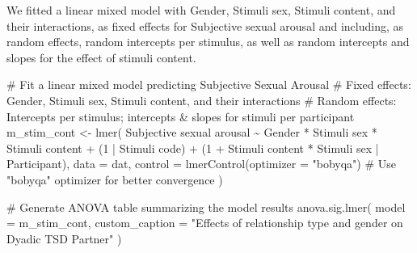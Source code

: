 \documentclass[
  bookmarksnumbered]{article}
\newenvironment{Shaded}{\begin{snugshade}}{\end{snugshade}}
\newcommand{\AttributeTok}[1]{\textcolor[rgb]{0.80,0.80,0.80}{#1}}
\newcommand{\CommentTok}[1]{\textcolor[rgb]{0.50,0.62,0.50}{#1}}
\newcommand{\DecValTok}[1]{\textcolor[rgb]{0.86,0.86,0.80}{#1}}
\newcommand{\FunctionTok}[1]{\textcolor[rgb]{0.94,0.94,0.56}{#1}}
\newcommand{\NormalTok}[1]{\textcolor[rgb]{0.80,0.80,0.80}{#1}}
\newcommand{\OtherTok}[1]{\textcolor[rgb]{0.94,0.94,0.56}{#1}}
\newcommand{\SpecialCharTok}[1]{\textcolor[rgb]{0.86,0.64,0.64}{#1}}
\newcommand{\StringTok}[1]{\textcolor[rgb]{0.80,0.58,0.58}{#1}}
\begin{document}
We fitted a linear mixed model with Gender, Stimuli sex, Stimuli content, and their interactions, as fixed effects for Subjective sexual arousal and including, as random effects, random intercepts per stimulus, as well as random intercepts and slopes for the effect of stimuli content.

\begin{Shaded}
\begin{Highlighting}[]
\CommentTok{\# Fit a linear mixed model predicting Subjective Sexual Arousal}
\CommentTok{\# Fixed effects: Gender, Stimuli sex, Stimuli content, and their interactions}
\CommentTok{\# Random effects: Intercepts per stimulus; intercepts \& slopes for stimuli per participant}
\NormalTok{m\_stim\_cont }\OtherTok{\textless{}{-}} \FunctionTok{lmer}\NormalTok{(}
  \StringTok{\textasciigrave{}}\AttributeTok{Subjective sexual arousal}\StringTok{\textasciigrave{}} \SpecialCharTok{\textasciitilde{}}\NormalTok{ Gender }\SpecialCharTok{*} \StringTok{\textasciigrave{}}\AttributeTok{Stimuli sex}\StringTok{\textasciigrave{}} \SpecialCharTok{*} \StringTok{\textasciigrave{}}\AttributeTok{Stimuli content}\StringTok{\textasciigrave{}} \SpecialCharTok{+}
\NormalTok{    (}\DecValTok{1} \SpecialCharTok{|} \StringTok{\textasciigrave{}}\AttributeTok{Stimuli code}\StringTok{\textasciigrave{}}\NormalTok{) }\SpecialCharTok{+}
\NormalTok{    (}\DecValTok{1} \SpecialCharTok{+} \StringTok{\textasciigrave{}}\AttributeTok{Stimuli content}\StringTok{\textasciigrave{}} \SpecialCharTok{*} \StringTok{\textasciigrave{}}\AttributeTok{Stimuli sex}\StringTok{\textasciigrave{}} \SpecialCharTok{|}\NormalTok{ Participant),}
  \AttributeTok{data =}\NormalTok{ dat,}
  \AttributeTok{control =} \FunctionTok{lmerControl}\NormalTok{(}\AttributeTok{optimizer =} \StringTok{"bobyqa"}\NormalTok{) }\CommentTok{\# Use "bobyqa" optimizer for better convergence}
\NormalTok{)}

\CommentTok{\# Generate ANOVA table summarizing the model results}
\FunctionTok{anova.sig.lmer}\NormalTok{(}
  \AttributeTok{model =}\NormalTok{ m\_stim\_cont,}
  \AttributeTok{custom\_caption =} \StringTok{"Effects of relationship type and gender on Dyadic TSD Partner"}
\NormalTok{)}
\end{Highlighting}
\end{Shaded}
\end{document}
